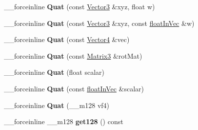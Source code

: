 \begin{DoxyCompactItemize}
\item 
\hypertarget{classVectormath_1_1Aos_1_1Quat_a7e4ef73e72c37f4600025100c7529515}{\-\_\-\-\_\-forceinline {\bfseries Quat} (const \hyperlink{classVectormath_1_1Aos_1_1Vector3}{Vector3} \&xyz, float w)}\label{classVectormath_1_1Aos_1_1Quat_a7e4ef73e72c37f4600025100c7529515}

\item 
\hypertarget{classVectormath_1_1Aos_1_1Quat_aec4b4b11f235c1b3662e814a804a435d}{\-\_\-\-\_\-forceinline {\bfseries Quat} (const \hyperlink{classVectormath_1_1Aos_1_1Vector3}{Vector3} \&xyz, const \hyperlink{classVectormath_1_1floatInVec}{float\-In\-Vec} \&w)}\label{classVectormath_1_1Aos_1_1Quat_aec4b4b11f235c1b3662e814a804a435d}

\item 
\hypertarget{classVectormath_1_1Aos_1_1Quat_a0dd950d914c0a19530b0c44093b050cf}{\-\_\-\-\_\-forceinline {\bfseries Quat} (const \hyperlink{classVectormath_1_1Aos_1_1Vector4}{Vector4} \&vec)}\label{classVectormath_1_1Aos_1_1Quat_a0dd950d914c0a19530b0c44093b050cf}

\item 
\hypertarget{classVectormath_1_1Aos_1_1Quat_a7a69e540338b53d2ca3da9778fbfe1e4}{\-\_\-\-\_\-forceinline {\bfseries Quat} (const \hyperlink{classVectormath_1_1Aos_1_1Matrix3}{Matrix3} \&rot\-Mat)}\label{classVectormath_1_1Aos_1_1Quat_a7a69e540338b53d2ca3da9778fbfe1e4}

\item 
\hypertarget{classVectormath_1_1Aos_1_1Quat_a4aa69d6de5aff50ec91cebf487135637}{\-\_\-\-\_\-forceinline {\bfseries Quat} (float scalar)}\label{classVectormath_1_1Aos_1_1Quat_a4aa69d6de5aff50ec91cebf487135637}

\item 
\hypertarget{classVectormath_1_1Aos_1_1Quat_a15d997048c2e1c44489f1188d5f1c92d}{\-\_\-\-\_\-forceinline {\bfseries Quat} (const \hyperlink{classVectormath_1_1floatInVec}{float\-In\-Vec} \&scalar)}\label{classVectormath_1_1Aos_1_1Quat_a15d997048c2e1c44489f1188d5f1c92d}

\item 
\hypertarget{classVectormath_1_1Aos_1_1Quat_a66046b14ef0aa36a1c13d5f5b0ce70d3}{\-\_\-\-\_\-forceinline {\bfseries Quat} (\-\_\-\-\_\-m128 vf4)}\label{classVectormath_1_1Aos_1_1Quat_a66046b14ef0aa36a1c13d5f5b0ce70d3}

\item 
\hypertarget{classVectormath_1_1Aos_1_1Quat_a466b1577b84dd8ccbb182635a0e3b167}{\-\_\-\-\_\-forceinline \-\_\-\-\_\-m128 {\bfseries get128} () const }\label{classVectormath_1_1Aos_1_1Quat_a466b1577b84dd8ccbb182635a0e3b167}


\end{DoxyCompactItemize}
